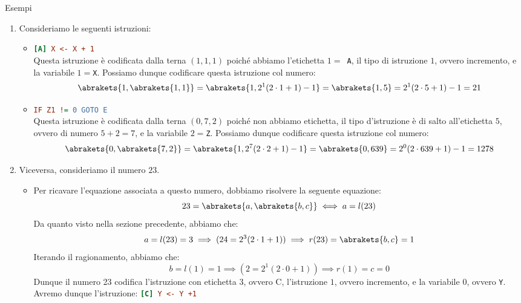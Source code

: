 \begin{generalbox}[colframe=azure-gradient-3!90!black]{Esempi}
  \begin{enumerate}
  \item Consideriamo le seguenti istruzioni:
  \begin{itemize}
    \item \lstinline[language=ini]{[A] X <- X + 1}\\
    Questa istruzione è codificata dalla terna \((1,1,1)\) poiché abbiamo l'etichetta \(1= \)\lstinline{ A}, il tipo di istruzione \(1\), ovvero incremento, e la variabile \(1=\)\lstinline{X}. Possiamo dunque codificare questa istruzione col numero:
    \begin{equation}
      \abrakets{ 1,\abrakets{ 1,1 } } = \abrakets{ 1, 2^1(2\cdot 1+1)-1 } = \abrakets{ 1,5 } = 2^1(2 \cdot 5 +1)-1=21
    \end{equation}
    \item \lstinline[language=ini]{IF Z1 != 0 GOTO E}\\ %
    Questa istruzione è codificata dalla terna \((0,7,2)\) poiché non abbiamo etichetta, il tipo d'istruzione è di salto all'etichetta \(5\), ovvero di numero \(5+2=7\), e la variabile \(2=\)\lstinline{Z}. Possiamo dunque codificare questa istruzione col numero:
    \begin{equation}
      \abrakets{ 0,\abrakets{ 7,2 } } = \abrakets{ 1, 2^7(2\cdot 2+1)-1 } = \abrakets{ 0,639 } = 2^0(2 \cdot 639 +1)-1=1278
    \end{equation}
  \end{itemize}
  \item Viceversa, consideriamo il numero \(23\).
    \begin{itemize}
      \item [] Per ricavare l'equazione associata a questo numero, dobbiamo risolvere la seguente equazione:
      \begin{equation}
          23=\abrakets{ a,\abrakets{ b,c } } \iff a=l(23)
      \end{equation}
      Da quanto visto nella sezione precedente, abbiamo che:
      \begin{equation}
        a = l(23) = 3 \implies (24=2^3(2\cdot 1+1))\implies r(23) = \abrakets{ b,c } = 1
      \end{equation}
      Iterando il ragionamento, abbiamo che:
      \begin{equation}
        b = l(1) = 1 \implies (2=2^1(2\cdot 0+1))\implies r(1) = c = 0
      \end{equation}
      Dunque il numero 23 codifica l'istruzione con etichetta \(3\), ovvero C, l'istruzione \(1\), ovvero incremento, e la variabile \(0\), ovvero \lstinline{Y}. Avremo dunque l'istruzione: \lstinline[language=ini]{[C] Y <- Y +1}
    \end{itemize}
  \end{enumerate}
\end{generalbox}

